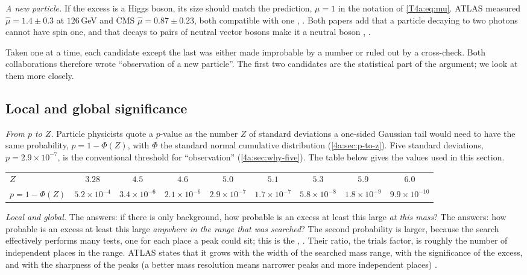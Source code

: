 \emph{A new particle.} If the excess is a Higgs boson, its size should match the prediction, $\mu=1$ in the notation of \eqref{T4a:eq:mu}. ATLAS measured $\hat\mu=1.4\pm0.3$ at $126$\,GeV and CMS $\hat\mu=0.87\pm0.23$, both compatible with one \cite[Sec.~9.3]{AadHiggs2012}, \cite[Sec.~7]{ChatrchyanHiggs2012}. Both papers add that a particle decaying to two photons cannot have spin one, and that decays to pairs of neutral vector bosons make it a neutral boson \cite[Sec.~10]{AadHiggs2012}, \cite[Sec.~7]{ChatrchyanHiggs2012}.

Taken one at a time, each candidate except the last was either made improbable by a number or ruled out by a cross-check. Both collaborations therefore wrote ``observation of a new particle''. The first two candidates are the statistical part of the argument; we look at them more closely.

\subsection{Local and global significance}
\label{T4a:sec:local-global}

\emph{From $p$ to $Z$.} Particle physicists quote a $p$-value as the number $Z$ of standard deviations a one-sided Gaussian tail would need to have the same probability, $p=1-\Phi(Z)$, with $\Phi$ the standard normal cumulative distribution (\cref{4a:sec:p-to-z}). Five standard deviations, $p=2.9\times10^{-7}$, is the conventional threshold for ``observation'' (\cref{4a:sec:why-five}). The table below gives the values used in this section.
\begin{center}
\footnotesize
\setlength{\tabcolsep}{3pt}
\begin{tabular}{lcccccccc}
\toprule
$Z$ & $3.28$ & $4.5$ & $4.6$ & $5.0$ & $5.1$ & $5.3$ & $5.9$ & $6.0$ \\
$p=1-\Phi(Z)$ & $5.2\times10^{-4}$ & $3.4\times10^{-6}$ & $2.1\times10^{-6}$ & $2.9\times10^{-7}$ & $1.7\times10^{-7}$ & $5.8\times10^{-8}$ & $1.8\times10^{-9}$ & $9.9\times10^{-10}$ \\
\bottomrule
\end{tabular}
\end{center}

\emph{Local and global.} The  answers: if there is only background, how probable is an excess at least this large \emph{at this mass}? The  answers: how probable is an excess at least this large \emph{anywhere in the range that was searched}? The second probability is larger, because the search effectively performs many tests, one for each place a peak could sit; this is the  \cite[\S40.3.2.2]{PDG2024}, \cite[Sec.~4]{ChatrchyanHiggs2012}. Their ratio, the trials factor, is roughly the number of independent places in the range. ATLAS states that it grows with the width of the searched mass range, with the significance of the excess, and with the sharpness of the peaks (a better mass resolution means narrower peaks and more independent places) \cite[Sec.~7]{AadHiggs2012}.

